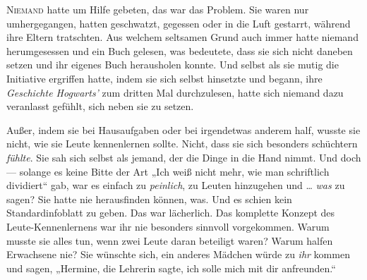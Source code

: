 \lettrine{N}{iemand} hatte um Hilfe gebeten, das war das Problem. Sie waren nur umhergegangen, hatten geschwatzt, gegessen oder in die Luft gestarrt, während ihre Eltern tratschten. Aus welchem seltsamen Grund auch immer hatte niemand herumgesessen und ein Buch gelesen, was bedeutete, dass sie sich nicht daneben setzen und ihr eigenes Buch herausholen konnte. Und selbst als sie mutig die Initiative ergriffen hatte, indem sie sich selbst hinsetzte und begann, ihre \emph{Geschichte Hogwarts’} zum dritten Mal durchzulesen, hatte sich niemand dazu veranlasst gefühlt, sich neben sie zu setzen.

Außer, indem sie bei Hausaufgaben oder bei irgendetwas anderem half, wusste sie nicht, wie sie Leute kennenlernen sollte. Nicht, dass sie sich besonders schüchtern \emph{fühlte}. Sie sah sich selbst als jemand, der die Dinge in die Hand nimmt. Und doch — solange es keine Bitte der Art
„Ich weiß nicht mehr, wie man schriftlich dividiert“ gab, war es einfach zu \emph{peinlich}, zu Leuten hinzugehen und … \emph{was} zu sagen? Sie hatte nie herausfinden können, was. Und es schien kein Standardinfoblatt zu geben. Das war lächerlich. Das komplette Konzept des Leute-Kennenlernens war ihr nie besonders sinnvoll vorgekommen. Warum musste sie alles tun, wenn zwei Leute daran beteiligt waren? Warum halfen Erwachsene nie? Sie wünschte sich, ein anderes Mädchen würde zu \emph{ihr} kommen und sagen,
„Hermine, die Lehrerin sagte, ich solle mich mit dir anfreunden.“

